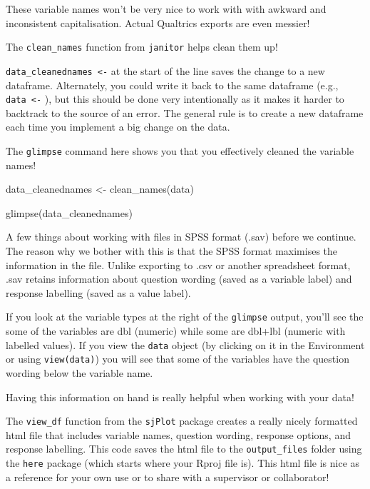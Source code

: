 \documentclass[
  letterpaper,
  DIV=11,
  numbers=noendperiod]{scrreprt}
\newenvironment{Shaded}{\begin{snugshade}}{\end{snugshade}}
\newcommand{\FunctionTok}[1]{\textcolor[rgb]{0.28,0.35,0.67}{#1}}
\newcommand{\NormalTok}[1]{\textcolor[rgb]{0.00,0.23,0.31}{#1}}
\newcommand{\OtherTok}[1]{\textcolor[rgb]{0.00,0.23,0.31}{#1}}
\begin{document}
These variable names won't be very nice to work with with awkward and
inconsistent capitalisation. Actual Qualtrics exports are even messier!

The \texttt{clean\_names} function from \texttt{janitor} helps clean
them up!

\texttt{data\_cleanednames\ \textless{}-} at the start of the line saves
the change to a new dataframe. Alternately, you could write it back to
the same dataframe (e.g., \texttt{data\ \textless{}-} ), but this should
be done very intentionally as it makes it harder to backtrack to the
source of an error. The general rule is to create a new dataframe each
time you implement a big change on the data.

The \texttt{glimpse} command here shows you that you effectively cleaned
the variable names!

\begin{Shaded}
\begin{Highlighting}[]
\NormalTok{data\_cleanednames }\OtherTok{\textless{}{-}} \FunctionTok{clean\_names}\NormalTok{(data)}

\FunctionTok{glimpse}\NormalTok{(data\_cleanednames)}
\end{Highlighting}
\end{Shaded}

A few things about working with files in SPSS format (.sav) before we
continue. The reason why we bother with this is that the SPSS format
maximises the information in the file. Unlike exporting to .csv or
another spreadsheet format, .sav retains information about question
wording (saved as a variable label) and response labelling (saved as a
value label).

If you look at the variable types at the right of the \texttt{glimpse}
output, you'll see the some of the variables are dbl (numeric) while
some are dbl+lbl (numeric with labelled values). If you view the
\texttt{data} object (by clicking on it in the Environment or using
\texttt{view(data)}) you will see that some of the variables have the
question wording below the variable name.

Having this information on hand is really helpful when working with your
data!

The \texttt{view\_df} function from the \texttt{sjPlot} package creates
a really nicely formatted html file that includes variable names,
question wording, response options, and response labelling. This code
saves the html file to the \texttt{output\_files} folder using the
\texttt{here} package (which starts where your Rproj file is). This html
file is nice as a reference for your own use or to share with a
supervisor or collaborator!
\end{document}
